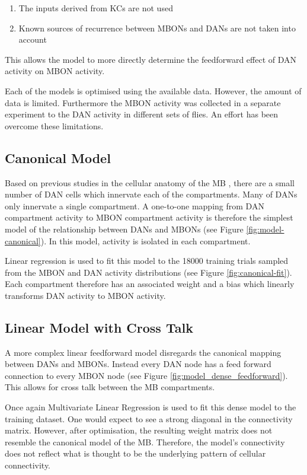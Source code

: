 \documentclass[11pt, A4]{article}
\begin{document}
\begin{multicols}{2}
\begin{enumerate}
\itemsep0em
\item
The inputs derived from KCs are not used
\item
Known sources of recurrence between MBONs and DANs are not taken into account
\end{enumerate}

This allows the model to more directly determine the feedforward effect of DAN activity on MBON activity. 

Each of the models is optimised using the available data. However, the amount of data is limited. Furthermore the MBON activity was collected in a separate experiment to the DAN activity in different sets of flies. An effort has been overcome these limitations.


		

\subsection{Canonical Model}

Based on previous studies in the cellular anatomy of the MB \cite{li2020connectome, aso2014neuronal}, there are a small number of DAN cells which innervate each of the compartments. Many of DANs only innervate a single compartment. A one-to-one mapping from DAN compartment activity to MBON compartment activity is therefore the simplest model of the relationship between DANs and MBONs (see Figure \ref{fig:model-canonical}). In this model, activity is isolated in each compartment. 


Linear regression is used to fit this model to the 18000 training trials sampled from the MBON and DAN activity distributions (see Figure \ref{fig:canonical-fit}). Each compartment therefore has an associated weight and a bias which linearly transforms DAN activity to MBON activity. 

\subsection{Linear Model with Cross Talk}
A more complex linear feedforward model disregards the canonical mapping between DANs and MBONs. Instead every DAN node has a feed forward connection to every MBON node (see Figure \ref{fig:model_dense_feedforward}). This allows for cross talk between the MB compartments. 


Once again Multivariate Linear Regression is used to fit this dense model to the training dataset. One would expect to see a strong diagonal in the connectivity matrix. However, after optimisation, the resulting weight matrix does not resemble the canonical model of the MB. Therefore, the model's connectivity does not reflect what is thought to be the underlying pattern of cellular connectivity. 


\end{multicols}
\end{document}
